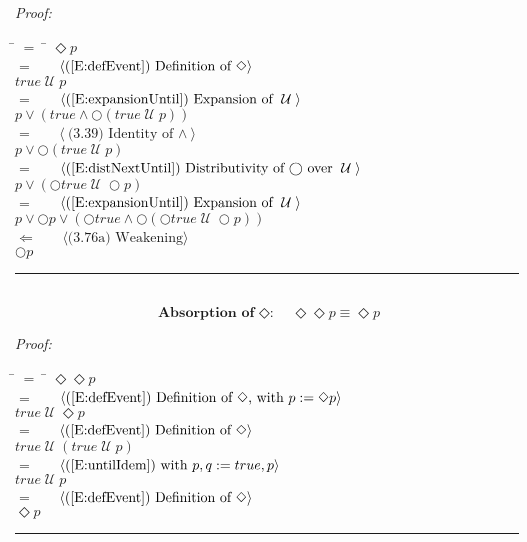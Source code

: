\documentclass[fleqn, leqno]{article}
\newcommand{\lgap}{2pt}                             %
\newcommand{\mymathindent}{24pt}                      %
\newcommand{\until}{\;\mathcal{U}\;}
\newcommand{\next}{\bigcirc}
\newcommand{\event}{\Diamond}
\newcommand{\myqed}{\hfill\rule[-.23ex]{1.2ex}{2.0ex}}
\newcommand{\Gll} {\langle}                         %
\newcommand{\Ggg} {\rangle}                         %
\newcommand{\Hint}[1]     {\ \ \ $\Gll              \mbox{#1} \Ggg$ }   %
\begin{document}
\emph{Proof:}
\begin{tabbing}
\hspace{\mymathindent} \= $= \;$ \= \kill
  \> \>   $\event p$\\[\lgap]
  \> $=$  \>  \Hint{(\ref{E:defEvent}) Definition of $\event$}\\[\lgap]
  \> \>   $true \until p$\\[\lgap]
  \> $=$  \>  \Hint{(\ref{E:expansionUntil}) Expansion of $\until$}\\[\lgap]
  \> \>   $p \lor (true \land \next(true \until p))$\\[\lgap]
  \> $=$  \>  \Hint{(3.39) Identity of $\land$}\\[\lgap]
  \> \>   $p \lor \next(true \until p)$\\[\lgap]
  \> $=$  \>  \Hint{(\ref{E:distNextUntil}) Distributivity of $\next$ over $\until$}\\[\lgap]
  \> \>   $p \lor (\next true \until \next p)$\\[\lgap]
  \> $=$  \>  \Hint{(\ref{E:expansionUntil}) Expansion of $\until$}\\[\lgap]
  \> \>   $p \lor \next p \lor (\next true \land \next(\next true \until \next p))$\\[\lgap]
  \> $\Leftarrow$ \> \Hint{(3.76a) Weakening}\\[\lgap]
  \> \>   $\next p$\\[\lgap]
\end{tabbing}
\myqed\\[\lgap]


\begin{equation}\label{E:IdemEvent}
\textbf{Absorption of $\event$:}\quad \event\event p \equiv \event p
\end{equation}

\emph{Proof:}
\begin{tabbing}
\hspace{\mymathindent} \= $= \;$ \= \kill
  \> \>   $\event\event p$\\[\lgap]
  \> $=$  \>  \Hint{(\ref{E:defEvent}) Definition of $\event$, with $p := \event p$}\\[\lgap]
  \> \>   $true \until \event p$\\[\lgap]
  \> $=$  \>  \Hint{(\ref{E:defEvent}) Definition of $\event$}\\[\lgap]
  \> \>   $true \until (true \until p)$\\[\lgap]
  \> $=$  \>  \Hint{(\ref{E:untilIdem}) with $p,q := true,p$}\\[\lgap]
  \> \>   $true \until p$\\[\lgap]
  \> $=$  \>  \Hint{(\ref{E:defEvent}) Definition of $\event$}\\[\lgap]
  \> \>   $\event p$\\[\lgap]
\end{tabbing}
\myqed\\[\lgap]
\end{document}
